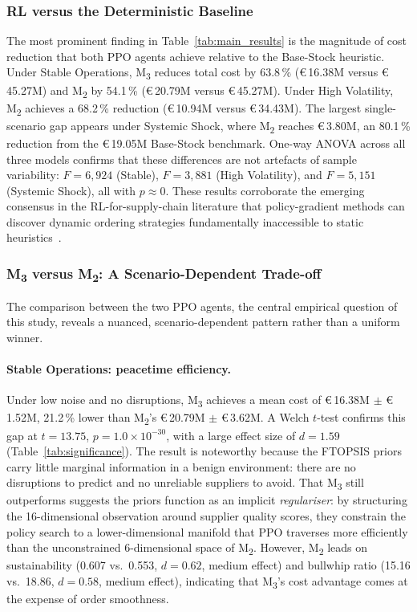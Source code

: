 \documentclass[preprint,12pt]{elsarticle}
\begin{document}
\subsubsection{RL versus the Deterministic Baseline}

The most prominent finding in Table~\ref{tab:main_results} is the magnitude of cost reduction that both PPO agents achieve relative to the Base-Stock heuristic.
Under Stable Operations, M\textsubscript{3} reduces total cost by 63.8\,\% (\euro\,16.38M versus \euro\,45.27M) and M\textsubscript{2} by 54.1\,\% (\euro\,20.79M versus \euro\,45.27M).
Under High Volatility, M\textsubscript{2} achieves a 68.2\,\% reduction (\euro\,10.94M versus \euro\,34.43M).
The largest single-scenario gap appears under Systemic Shock, where M\textsubscript{2} reaches \euro\,3.80M, an 80.1\,\% reduction from the \euro\,19.05M Base-Stock benchmark.
One-way ANOVA across all three models confirms that these differences are not artefacts of sample variability: $F = 6{,}924$ (Stable), $F = 3{,}881$ (High Volatility), and $F = 5{,}151$ (Systemic Shock), all with $p \approx 0$.
These results corroborate the emerging consensus in the RL-for-supply-chain literature that policy-gradient methods can discover dynamic ordering strategies fundamentally inaccessible to static heuristics~\citep{Wang_etal_2022,Li_etal_2024}.

\subsubsection{\texorpdfstring{M\textsubscript{3} versus M\textsubscript{2}}{M3 versus M2}: A Scenario-Dependent Trade-off}

The comparison between the two PPO agents, the central empirical question of this study, reveals a nuanced, scenario-dependent pattern rather than a uniform winner.

\paragraph{Stable Operations: peacetime efficiency.}
Under low noise and no disruptions, M\textsubscript{3} achieves a mean cost of \euro\,16.38M $\pm$ \euro\,1.52M, 21.2\,\% lower than M\textsubscript{2}'s \euro\,20.79M $\pm$ \euro\,3.62M.
A Welch $t$-test confirms this gap at $t = 13.75$, $p = 1.0\!\times\!10^{-30}$, with a large effect size of $d = 1.59$ (Table~\ref{tab:significance}).
The result is noteworthy because the FTOPSIS priors carry little marginal information in a benign environment: there are no disruptions to predict and no unreliable suppliers to avoid.
That M\textsubscript{3} still outperforms suggests the priors function as an implicit \emph{regulariser}: by structuring the 16-dimensional observation around supplier quality scores, they constrain the policy search to a lower-dimensional manifold that PPO traverses more efficiently than the unconstrained 6-dimensional space of M\textsubscript{2}.
However, M\textsubscript{2} leads on sustainability (0.607 vs.\ 0.553, $d = 0.62$, medium effect) and bullwhip ratio (15.16 vs.\ 18.86, $d = 0.58$, medium effect), indicating that M\textsubscript{3}'s cost advantage comes at the expense of order smoothness.
\end{document}
